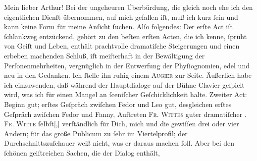 \pstart\center{}Mein lieber Arthur!\pend\vspace{0.5em}
\pstart
           Bei der ungeheuren Überbürdung, die gleich noch ehe ich den eigentlichen Dienſt
               übernommen, auf mich gefallen iſt, muß ich kurz ſein und kann keine Form für meine
               Anſicht ſuchen. Alſo folgendes: Der erſte Act iſt ſchlankweg entzückend, gehört zu den beſten erſten
               Acten, die ich kenne, ſprüht von Geiſt und Leben, enthält prachtvolle dramatiſche
               Steigerungen und einen  erbeben machenden Schluß,
               iſt meiſterhaft in der Bewältigung der Perſonenmehrheiten, vergnüglich in der
               Entwerfung der Phyſiognomien, edel und neu in den Gedanken. Ich ſtelle ihn ruhig
               einem \textsc{Augier} zur Seite. Äußerlich habe ich einzuwenden, daß während der Hauptdialoge auf der
               Bühne Clavier geſpielt wird, was ich für einen Mangel an ſceniſcher Geſchicklichkeit
               halte. Zweiter Act: Beginn
               gut; erſtes Geſpräch zwiſchen Fedor und Leo gut,
               desgleichen erſtes Geſpräch zwiſchen Fedor und Fanny, {\pb}Auftreten \textsc{Fr.
                     Wittes} guter dramatiſcher \label{K_L02674-1v}\label{K_L02674-1}. \textsc{Fr. Witte}{ }ſelbſt{[},{]} verſtändlich für Dich,
               mich und die gewiſſen drei oder vier Andern; für das große Publicum zu ſehr im
               Viertelprofil; der Durchschnittszuſchauer weiß nicht, was er daraus \strikeout{\textcolor{gray}{×}\-\textcolor{gray}{×}} machen ſoll. Aber bei den ſchönen geiſtreichen Sachen, die der Dialog enthält,
